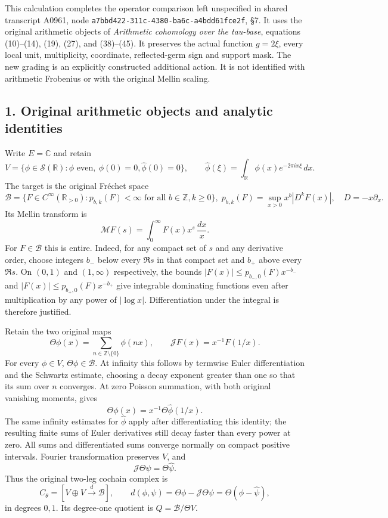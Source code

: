 This calculation completes the operator comparison left unspecified in
shared transcript A0961, node
\texttt{a7bbd422-\allowbreak{}311c-\allowbreak{}4380-\allowbreak{}ba6c-\allowbreak{}a4bdd61fce2f}, §7. It uses the original
arithmetic objects of \emph{Arithmetic cohomology over the tau-base},
equations (10)--(14), (19), (27), and (38)--(45). It preserves the
actual function \(g=2\xi\), every local unit, multiplicity, coordinate,
reflected-germ sign and support mask. The new grading is an explicitly
constructed additional action. It is not identified with arithmetic
Frobenius or with the original Mellin scaling.

\subsection{1. Original arithmetic objects and analytic
identities}\label{TranscriptStage:proof05:original-arithmetic-objects-and-analytic-identities}

Write \(E=\mathbb C\) and retain \[
 V=\{\phi\in\mathcal S(\mathbb R):\phi\text{ even},\ \phi(0)=0,
              \widehat\phi(0)=0\},\qquad
 \widehat\phi(\xi)=\int_{\mathbb R}\phi(x)e^{-2\pi i x\xi}\,dx.
\] The target is the original Fréchet space \[
 \mathscr B=\{F\in C^\infty(\mathbb R_{>0}):p_{b,k}(F)<\infty
                       \text{ for all }b\in\mathbb Z,k\ge0\},
 \; p_{b,k}(F)=\sup_{x>0}x^b|D^kF(x)|,
 \quad D=-x\partial_x.
\] Its Mellin transform is \[
 \mathcal MF(s)=\int_0^\infty F(x)x^s\,\frac{dx}{x}.
\] For \(F\in\mathscr B\) this is entire. Indeed, for any compact set of
\(s\) and any derivative order, choose integers \(b_-\) below every
\(\Re s\) in that compact set and \(b_+\) above every \(\Re s\). On
\((0,1)\) and \((1,\infty)\) respectively, the bounds
\(|F(x)|\le p_{b_-,0}(F)x^{-b_-}\) and
\(|F(x)|\le p_{b_+,0}(F)x^{-b_+}\) give integrable dominating functions
even after multiplication by any power of \(|\log x|\). Differentiation
under the integral is therefore justified.

Retain the two original maps \[
 \Theta\phi(x)=\sum_{n\in\mathbb Z\setminus\{0\}}\phi(nx),
 \qquad \mathcal JF(x)=x^{-1}F(1/x).
\] For every \(\phi\in V\), \(\Theta\phi\in\mathscr B\). At infinity
this follows by termwise Euler differentiation and the Schwartz
estimate, choosing a decay exponent greater than one so that its sum
over \(n\) converges. At zero Poisson summation, with both original
vanishing moments, gives \[
 \Theta\phi(x)=x^{-1}\Theta\widehat\phi(1/x).
\] The same infinity estimates for \(\widehat\phi\) apply after
differentiating this identity; the resulting finite sums of Euler
derivatives still decay faster than every power at zero. All sums and
differentiated sums converge normally on compact positive intervals.
Fourier transformation preserves \(V\), and \[
 \mathcal J\Theta\psi=\Theta\widehat\psi.
\] Thus the original two-leg cochain complex is \[
 C_\theta=[V\oplus V\xrightarrow{d}\mathscr B],\qquad
 d(\phi,\psi)=\Theta\phi-\mathcal J\Theta\psi
             =\Theta(\phi-\widehat\psi),
\] in degrees \(0,1\). Its degree-one quotient is
\(Q=\mathscr B/\Theta V\).

